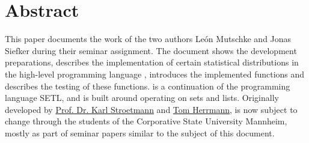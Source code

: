 
\chapter*{Abstract}

	This paper documents the work of the two authors Le\'{o}n Mutschke and Jonas Siefker during their seminar assignment. The document shows the development preparations, describes the implementation of certain statistical distributions in the high-level programming language \setlx, introduces the implemented functions and describes the testing of these functions. \SetlX is a continuation of the programming language SETL, and is built around operating on sets and lists. Originally developed by \href{https://github.com/karlstroetmann}{Prof. Dr. Karl Stroetmann} and \href{https://github.com/herrmanntom}{Tom Herrmann}, \setlX is now subject to change through the students of the Corporative State University Mannheim, mostly as part of seminar papers similar to the subject of this document.